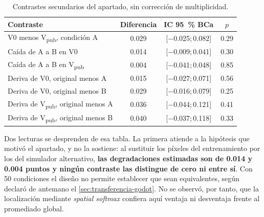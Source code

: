 \begin{table}[htbp]
  \centering
  \caption{Contrastes secundarios del apartado, sin correcci\'on de multiplicidad.}
  \label{tab:godot-secundarios}
  \small
  \scriptsize
  \begin{tabular}{l c c c}
    \toprule
    Contraste & Diferencia & IC \SI{95}{\percent} BCa & $p$ \\
    \midrule
    V0 menos V\textsubscript{pub}, condici\'on A & \num{0.029} &
      {[\num{-0.025};\,\num{0.082}]} & \num{0.29} \\
    \midrule
    Ca\'ida de A a B en V0 & \num{0.014} & {[\num{-0.009};\,\num{0.041}]} & \num{0.30} \\
    Ca\'ida de A a B en V\textsubscript{pub} & \num{0.004} &
      {[\num{-0.041};\,\num{0.048}]} & \num{0.85} \\
    \midrule
    Deriva de V0, original menos A & \num{0.015} & {[\num{-0.027};\,\num{0.071}]} &
      \num{0.56} \\
    Deriva de V0, original menos B & \num{0.029} & {[\num{-0.016};\,\num{0.079}]} &
      \num{0.25} \\
    Deriva de V\textsubscript{pub}, original menos A & \num{0.036} &
      {[\num{-0.044};\,\num{0.121}]} & \num{0.41} \\
    Deriva de V\textsubscript{pub}, original menos B & \num{0.040} &
      {[\num{-0.037};\,\num{0.118}]} & \num{0.33} \\
    \bottomrule
  \end{tabular}
\end{table}

Dos lecturas se desprenden de esa tabla. La primera atiende a la hip\'otesis que motiv\'o el
apartado, y no la sostiene: al sustituir los p\'ixeles del entrenamiento por los del
simulador alternativo, \textbf{las degradaciones estimadas son de \num{0.014} y \num{0.004}
puntos y ning\'un contraste las distingue de cero ni entre s\'i}. Con \num{50} condiciones
el dise\~no no permite establecer que sean equivalentes, seg\'un declar\'o de antemano el
\cref{sec:transferencia-godot}. No se observ\'o, por tanto, que la localizaci\'on mediante
\textit{spatial softmax} confiera aqu\'i ventaja ni desventaja frente al promediado global.

